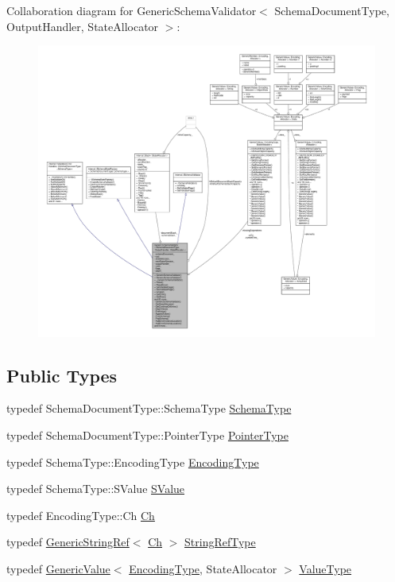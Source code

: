 Collaboration diagram for Generic\+Schema\+Validator$<$ Schema\+Document\+Type, Output\+Handler, State\+Allocator $>$\+:
\nopagebreak
\begin{figure}[H]
\begin{center}
\leavevmode
\includegraphics[width=350pt]{classGenericSchemaValidator__coll__graph}
\end{center}
\end{figure}
\subsection*{Public Types}
\begin{DoxyCompactItemize}
\item 
typedef Schema\+Document\+Type\+::\+Schema\+Type \hyperlink{classGenericSchemaValidator_ac79628f00f6720bbabb70b44f0d076a0}{Schema\+Type}
\item 
typedef Schema\+Document\+Type\+::\+Pointer\+Type \hyperlink{classGenericSchemaValidator_ae0c6c9a9c0ff6bae80e75c6705f2668b}{Pointer\+Type}
\item 
typedef Schema\+Type\+::\+Encoding\+Type \hyperlink{classGenericSchemaValidator_acf1c5361bb96da87d23167d8720b1ea5}{Encoding\+Type}
\item 
typedef Schema\+Type\+::\+S\+Value \hyperlink{classGenericSchemaValidator_a3c004e35c7eb9fa5a28c0ccfb8ac62dc}{S\+Value}
\item 
typedef Encoding\+Type\+::\+Ch \hyperlink{classGenericSchemaValidator_a8b7dab5a0cda9cc0adaefb4401d260c1}{Ch}
\item 
typedef \hyperlink{structGenericStringRef}{Generic\+String\+Ref}$<$ \hyperlink{classGenericSchemaValidator_a8b7dab5a0cda9cc0adaefb4401d260c1}{Ch} $>$ \hyperlink{classGenericSchemaValidator_a604160fcd6af7582e0deccc205309dcf}{String\+Ref\+Type}
\item 
typedef \hyperlink{classGenericValue}{Generic\+Value}$<$ \hyperlink{classGenericSchemaValidator_acf1c5361bb96da87d23167d8720b1ea5}{Encoding\+Type}, State\+Allocator $>$ \hyperlink{classGenericSchemaValidator_a435890a2dddeecb896d4ac76de03ca68}{Value\+Type}
\end{DoxyCompactItemize}
